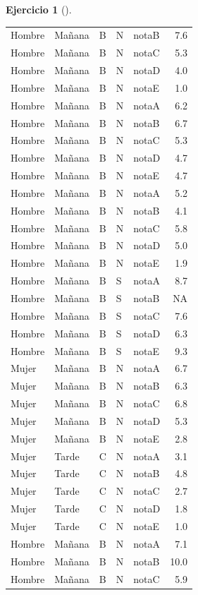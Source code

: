 \documentclass[
  a4paper,
]{scrreport}
\theoremstyle{definition}
\newtheorem{exercise}{Ejercicio}[chapter]
\theoremstyle{remark}
\begin{document}
\begin{exercise}[]
\begin{enumerate}
\begin{tcolorbox}
\begin{longtable}[]{@{}lllllr@{}}
  Hombre & Mañana & B & N & notaB & 7.6 \\
  Hombre & Mañana & B & N & notaC & 5.3 \\
  Hombre & Mañana & B & N & notaD & 4.0 \\
  Hombre & Mañana & B & N & notaE & 1.0 \\
  Hombre & Mañana & B & N & notaA & 6.2 \\
  Hombre & Mañana & B & N & notaB & 6.7 \\
  Hombre & Mañana & B & N & notaC & 5.3 \\
  Hombre & Mañana & B & N & notaD & 4.7 \\
  Hombre & Mañana & B & N & notaE & 4.7 \\
  Hombre & Mañana & B & N & notaA & 5.2 \\
  Hombre & Mañana & B & N & notaB & 4.1 \\
  Hombre & Mañana & B & N & notaC & 5.8 \\
  Hombre & Mañana & B & N & notaD & 5.0 \\
  Hombre & Mañana & B & N & notaE & 1.9 \\
  Hombre & Mañana & B & S & notaA & 8.7 \\
  Hombre & Mañana & B & S & notaB & NA \\
  Hombre & Mañana & B & S & notaC & 7.6 \\
  Hombre & Mañana & B & S & notaD & 6.3 \\
  Hombre & Mañana & B & S & notaE & 9.3 \\
  Mujer & Mañana & B & N & notaA & 6.7 \\
  Mujer & Mañana & B & N & notaB & 6.3 \\
  Mujer & Mañana & B & N & notaC & 6.8 \\
  Mujer & Mañana & B & N & notaD & 5.3 \\
  Mujer & Mañana & B & N & notaE & 2.8 \\
  Mujer & Tarde & C & N & notaA & 3.1 \\
  Mujer & Tarde & C & N & notaB & 4.8 \\
  Mujer & Tarde & C & N & notaC & 2.7 \\
  Mujer & Tarde & C & N & notaD & 1.8 \\
  Mujer & Tarde & C & N & notaE & 1.0 \\
  Hombre & Mañana & B & N & notaA & 7.1 \\
  Hombre & Mañana & B & N & notaB & 10.0 \\
  Hombre & Mañana & B & N & notaC & 5.9 \\

\end{longtable}
\end{tcolorbox}
\end{enumerate}
\end{exercise}
\end{document}
